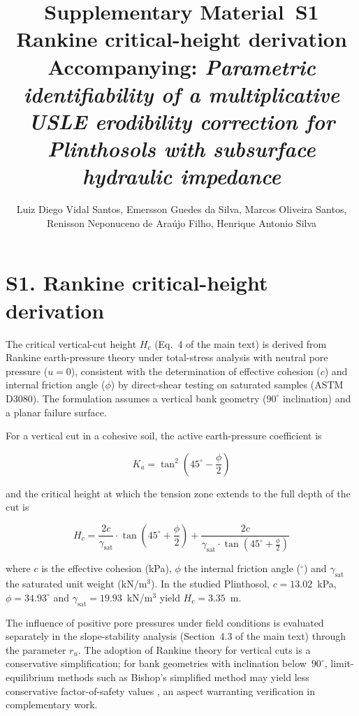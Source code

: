 ﻿\documentclass[12pt,a4paper]{article}
\title{\textbf{Supplementary Material~S1}\\[6pt]
Rankine critical-height derivation\\[6pt]
\large Accompanying: \textit{Parametric identifiability of a multiplicative USLE erodibility correction for Plinthosols with subsurface hydraulic impedance}}
\author{Luiz Diego Vidal Santos, Emersson Guedes da Silva, Marcos Oliveira Santos,\\
Renisson Neponuceno de Ara\'{u}jo Filho, Henrique Antonio Silva}
\date{}
\begin{document}
\maketitle

\section*{S1. Rankine critical-height derivation}

The critical vertical-cut height $H_c$ (Eq.~4 of the main text) is derived from Rankine earth-pressure theory under total-stress analysis with neutral pore pressure ($u = 0$), consistent with the determination of effective cohesion ($c$) and internal friction angle ($\phi$) by direct-shear testing on saturated samples (ASTM D3080). The formulation assumes a vertical bank geometry ($90^\circ$ inclination) and a planar failure surface.

For a vertical cut in a cohesive soil, the active earth-pressure coefficient is

\begin{equation}
K_a = \tan^2\!\left(45^\circ - \frac{\phi}{2}\right)
\end{equation}

\noindent and the critical height at which the tension zone extends to the full depth of the cut is

\begin{equation}
H_c = \frac{2c}{\gamma_{\mathrm{sat}}} \cdot \tan\!\left(45^\circ + \frac{\phi}{2}\right) + \frac{2c}{\gamma_{\mathrm{sat}} \cdot \tan\!\left(45^\circ + \frac{\phi}{2}\right)}
\end{equation}

\noindent where $c$ is the effective cohesion (kPa), $\phi$ the internal friction angle ($^\circ$) and $\gamma_{\mathrm{sat}}$ the saturated unit weight (kN/m$^3$). In the studied Plinthosol, $c = 13.02$~kPa, $\phi = 34.93^\circ$ and $\gamma_{\mathrm{sat}} = 19.93$~kN/m$^3$ yield $H_c = 3.35$~m.

The influence of positive pore pressures under field conditions is evaluated separately in the slope-stability analysis (Section~4.3 of the main text) through the parameter $r_u$. The adoption of Rankine theory for vertical cuts is a conservative simplification; for bank geometries with inclination below~$90^\circ$, limit-equilibrium methods such as Bishop's simplified method may yield less conservative factor-of-safety values \citep{fredlund_rahardjo_1993}, an aspect warranting verification in complementary work.



\end{document}
